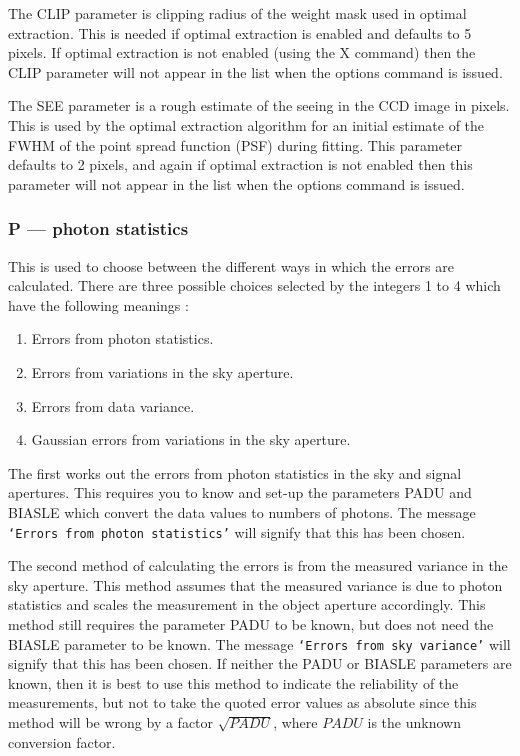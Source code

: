 \documentclass[twoside,11pt,nolof]{starlink}
\providecommand{\st}[1]{\texttt{`#1'}}
\begin{document}
The CLIP parameter is clipping radius of the weight mask used in optimal
extraction. This is needed if optimal extraction is enabled and defaults
to 5 pixels. If optimal extraction is not enabled (using the X command)
then the CLIP parameter will not appear in the list when the options
command is issued.

The SEE parameter is a rough estimate of the seeing in the CCD image in
pixels. This is used by the optimal extraction algorithm for an initial
estimate of the FWHM of the point spread function (PSF) during fitting.
This parameter defaults to 2 pixels, and again if optimal extraction is not enabled then this parameter will not appear in the list when the options
command is issued.

\subsubsection{P --- photon statistics}

This is used to choose between the different ways in which the errors
are calculated. There are three possible choices selected by the integers
1 to 4 which have the following meanings :
\begin{enumerate}
\item Errors from photon statistics.
\item Errors from variations in the sky aperture.
\item Errors from data variance.
\item Gaussian errors from variations in the sky aperture.
\end{enumerate}
The first works out the errors from photon statistics in the sky and
signal apertures. This requires you to know and set-up the parameters
PADU and BIASLE which convert the data values to numbers of
photons. The message \st{Errors from photon statistics} will
signify that this has been chosen.

The second method of calculating the errors is from the measured
variance in the sky aperture. This method assumes that the measured
variance is due to photon statistics and scales the measurement in
the object aperture accordingly. This method still requires the
parameter PADU to be known, but does not need the BIASLE parameter to
be known. The message \st{Errors from sky variance} will signify that
this has been chosen. If neither the PADU or BIASLE parameters are
known, then it is best to use this method to indicate the reliability
of the measurements, but not to take the quoted error values as
absolute since this method will be wrong by a factor $\sqrt{PADU}$,
where $PADU$ is the unknown conversion factor.
\end{document}
